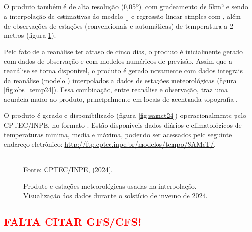 \subsection{}

\indent O produto  também é de alta resolução (0,05º), com gradeamento de 5km² e sendo a interpolação de estimativas do modelo  [] e regressão linear simples com , além de observações de estações (convencionais e automáticas) de temperatura a 2 metros (figura \ref{fig:samet_obs24}).
 
\indent Pelo fato de a reanálise ter atraso de cinco dias, o produto é inicialmente gerado com dados de observação e com modelos numéricos de previsão. Assim que a reanálise se torna disponível, o produto é gerado novamente com dados integrais da reanálise (modelo ) interpolados a dados de estações meteorológicas (figura \ref{fig:obs_temp24}). Essa combinação, entre reanálise e observação, traz uma acurácia maior ao produto, principalmente em locais de acentuada topografia \cite{Rozante2021SAMeT}.

\indent O produto é gerado e disponibilizado (figura \ref{fig:samet24}) operacionalmente pelo \acrshort{CPTEC}/\acrshort{INPE}, no formato . Estão disponíveis dados diários e climatológicos de temperaturas mínima, média e máxima, podendo ser acessados pelo seguinte endereço eletrônico: \url{http://ftp.cptec.inpe.br/modelos/tempo/SAMeT/}.

\begin{figure}[htbp]
    \centering
    \caption{Produto  e estações meteorológicas usadas na interpolação. Visualização dos dados durante o solstício de inverno de 2024.} %
    \label{fig:samet_obs24}
    \hfill
    \\
    \small{Fonte: \acrshort{CPTEC}/\acrshort{INPE}, \citeauthor{Rozante2021SAMeT} (2024).}
\end{figure}

\subsection{\textcolor{red}{FALTA CITAR GFS/CFS!}}


